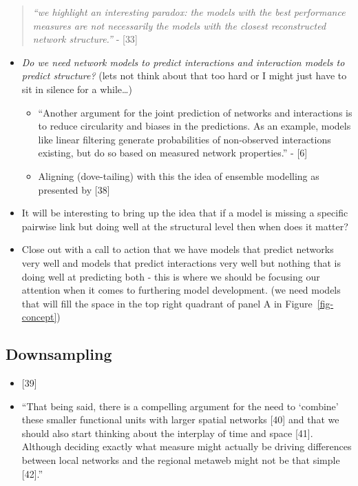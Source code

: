 \documentclass[
]{article}
\begin{document}
\begin{quote}
\emph{``we highlight an interesting paradox: the models with the best
performance measures are not necessarily the models with the closest
reconstructed network structure.''} - {[}33{]}
\end{quote}

\begin{itemize}
\item
  \emph{Do we need network models to predict interactions and
  interaction models to predict structure?} (lets not think about that
  too hard or I might just have to sit in silence for a while\ldots)

  \begin{itemize}
  \item
    ``Another argument for the joint prediction of networks and
    interactions is to reduce circularity and biases in the predictions.
    As an example, models like linear filtering generate probabilities
    of non-observed interactions existing, but do so based on measured
    network properties.'' - {[}6{]}
  \item
    Aligning (dove-tailing) with this the idea of ensemble modelling as
    presented by {[}38{]}
  \end{itemize}
\item
  It will be interesting to bring up the idea that if a model is missing
  a specific pairwise link but doing well at the structural level then
  when does it matter?
\item
  Close out with a call to action that we have models that predict
  networks very well and models that predict interactions very well but
  nothing that is doing well at predicting both - this is where we
  should be focusing our attention when it comes to furthering model
  development. (we need models that will fill the space in the top right
  quadrant of panel A in Figure~\ref{fig-concept})
\end{itemize}

\subsection{Downsampling}\label{downsampling}

\begin{itemize}
\item
  {[}39{]}
\item
  ``That being said, there is a compelling argument for the need to
  `combine' these smaller functional units with larger spatial networks
  {[}40{]} and that we should also start thinking about the interplay of
  time and space {[}41{]}. Although deciding exactly what measure might
  actually be driving differences between local networks and the
  regional metaweb might not be that simple {[}42{]}.''
\end{itemize}
\end{document}
